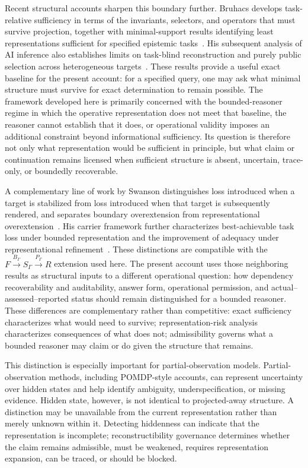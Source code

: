 \documentclass[11pt]{article}
\begin{document}
Recent structural accounts sharpen this boundary further. Bruhacs develops task-relative sufficiency in terms of the invariants, selectors, and operators that must survive projection, together with minimal-support results identifying least representations sufficient for specified epistemic tasks~\cite{Bruhacs2026Projection,Bruhacs2026Hidden}. His subsequent analysis of AI inference also establishes limits on task-blind reconstruction and purely public selection across heterogeneous targets~\cite{Bruhacs2026Limits}. These results provide a useful exact baseline for the present account: for a specified query, one may ask what minimal structure must survive for exact determination to remain possible. The framework developed here is primarily concerned with the bounded-reasoner regime in which the operative representation does not meet that baseline, the reasoner cannot establish that it does, or operational validity imposes an additional constraint beyond informational sufficiency. Its question is therefore not only what representation would be sufficient in principle, but what claim or continuation remains licensed when sufficient structure is absent, uncertain, trace-only, or boundedly recoverable.

A complementary line of work by Swanson distinguishes loss introduced when a target is stabilized from loss introduced when that target is subsequently rendered, and separates boundary overextension from representational overextension~\cite{Swanson2026Monist}. His carrier framework further characterizes best-achievable task loss under bounded representation and the improvement of adequacy under representational refinement~\cite{Swanson2026Carriers}. These distinctions are compatible with the \(F\xrightarrow{B_{\Gamma}}S_{\Gamma}\xrightarrow{P_{\Gamma}}R\) extension used here. The present account uses those neighboring results as structural inputs to a different operational question: how dependency recoverability and auditability, answer form, operational permission, and actual--assessed--reported status should remain distinguished for a bounded reasoner. These differences are complementary rather than competitive: exact sufficiency characterizes what would need to survive; representation-risk analysis characterizes consequences of what does not; admissibility governs what a bounded reasoner may claim or do given the structure that remains.

This distinction is especially important for partial-observation models. Partial-observation methods, including POMDP-style accounts, can represent uncertainty over hidden states and help identify ambiguity, underspecification, or missing evidence. Hidden state, however, is not identical to projected-away structure. A distinction may be unavailable from the current representation rather than merely unknown within it. Detecting hiddenness can indicate that the representation is incomplete; reconstructibility governance determines whether the claim remains admissible, must be weakened, requires representation expansion, can be traced, or should be blocked.
\end{document}
